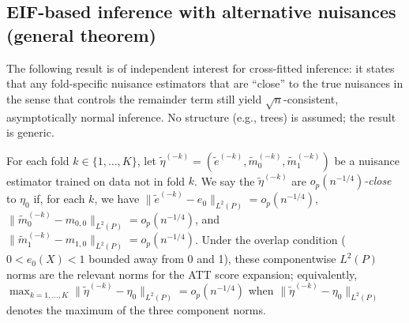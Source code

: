 \documentclass[12pt]{article}
\begin{document}
\subsection{EIF-based inference with alternative nuisances (general theorem)}
\label{app:alt-nuisances}

The following result is of independent interest for cross-fitted inference: it states that any fold-specific nuisance estimators that are ``close'' to the true nuisances in the sense that controls the remainder term still yield $\sqrt{n}$-consistent, asymptotically normal inference. No structure (e.g., trees) is assumed; the result is generic.

\begin{definition}
\label{def:close}
For each fold $k \in \{1,\ldots,K\}$, let $\tilde{\eta}^{(-k)} = (\tilde{e}^{(-k)}, \tilde{m}_0^{(-k)}, \tilde{m}_1^{(-k)})$ be a nuisance estimator trained on data not in fold $k$. We say the $\tilde{\eta}^{(-k)}$ are \emph{$o_p(n^{-1/4})$-close} to $\eta_0$ if, for each $k$, we have $\|\tilde{e}^{(-k)} - e_0\|_{L^2(P)} = o_p(n^{-1/4})$, $\|\tilde{m}_0^{(-k)} - m_{0,0}\|_{L^2(P)} = o_p(n^{-1/4})$, and $\|\tilde{m}_1^{(-k)} - m_{1,0}\|_{L^2(P)} = o_p(n^{-1/4})$. Under the overlap condition ($0 < e_0(X) < 1$ bounded away from 0 and 1), these componentwise $L^2(P)$ norms are the relevant norms for the ATT score expansion; equivalently, $\max_{k=1,\ldots,K} \|\tilde{\eta}^{(-k)} - \eta_0\|_{L^2(P)} = o_p(n^{-1/4})$ when $\|\tilde{\eta}^{(-k)} - \eta_0\|_{L^2(P)}$ denotes the maximum of the three component norms.
\end{definition}
\end{document}
